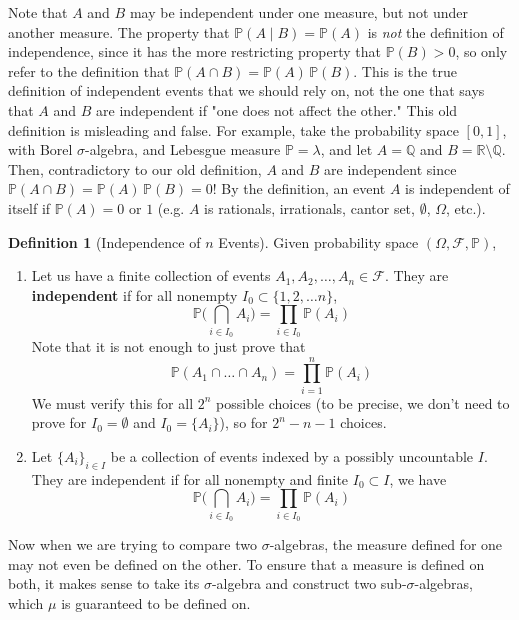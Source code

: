 \documentclass{article}
\theoremstyle{definition}
\theoremstyle{remark}
\theoremstyle{definition}
\newtheorem{definition}{Definition}[section]
\begin{document}
Note that $A$ and $B$ may be independent under one measure, but not under another measure. The property that $\mathbb{P}(A \mid B) = \mathbb{P}(A)$ is \textit{not} the definition of independence, since it has the more restricting property that $\mathbb{P}(B) > 0$, so only refer to the definition that $\mathbb{P}(A \cap B) = \mathbb{P}(A) \, \mathbb{P}(B)$. This is the true definition of independent events that we should rely on, not the one that says that $A$ and $B$ are independent if "one does not affect the other." This old definition is misleading and false. For example, take the probability space $[0, 1]$, with Borel $\sigma$-algebra, and Lebesgue measure $\mathbb{P} = \lambda$, and let $A = \mathbb{Q}$ and $B = \mathbb{R} \setminus \mathbb{Q}$. Then, contradictory to our old definition, $A$ and $B$ are independent since $\mathbb{P}(A \cap B) = \mathbb{P}(A) \, \mathbb{P}(B) = 0$! By the definition, an event $A$ is independent of itself if $\mathbb{P}(A) = 0$ or $1$ (e.g. $A$ is rationals, irrationals, cantor set, $\emptyset$, $\Omega$, etc.). 

\begin{definition}[Independence of $n$ Events]
Given probability space $(\Omega, \mathcal{F}, \mathbb{P})$, 
\begin{enumerate}
    \item Let us have a finite collection of events $A_1, A_2, \ldots, A_n \in \mathcal{F}$. They are \textbf{independent} if for all nonempty $I_0 \subset \{1, 2, \ldots n\}$, 
    \[\mathbb{P} \bigg( \bigcap_{i \in I_0} A_i \bigg) = \prod_{i \in I_0} \mathbb{P}(A_i)\]
    Note that it is not enough to just prove that 
    \[\mathbb{P}(A_1 \cap \ldots \cap A_n) = \prod_{i=1}^n \mathbb{P}(A_i)\]
    We must verify this for all $2^n$ possible choices (to be precise, we don't need to prove for $I_0 = \emptyset$ and $I_0 = \{A_i\}$), so for $2^n - n - 1$ choices. 
    
    \item Let $\{A_i\}_{i \in I}$ be a collection of events indexed by a possibly uncountable $I$. They are independent if for all nonempty and finite $I_0 \subset I$, we have 
\[\mathbb{P} \bigg( \bigcap_{i \in I_0} A_i \bigg) = \prod_{i \in I_0} \mathbb{P}(A_i)\]
\end{enumerate}
\end{definition}

Now when we are trying to compare two $\sigma$-algebras, the measure defined for one may not even be defined on the other. To ensure that a measure is defined on both, it makes sense to take its $\sigma$-algebra and construct two sub-$\sigma$-algebras, which $\mu$ is guaranteed to be defined on. 
\end{document}
